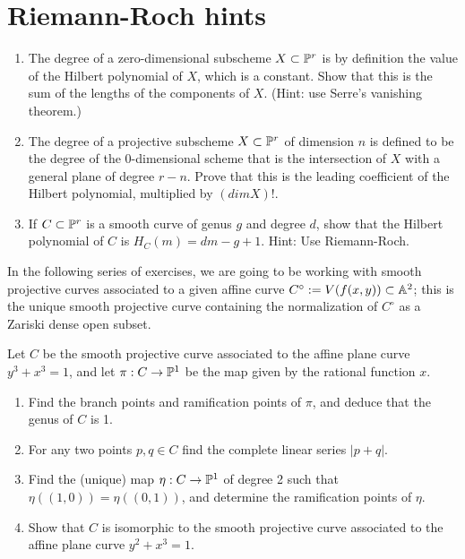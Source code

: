 

\chapter{Riemann-Roch hints}\label{Inflections hints}

 \begin{exercise}\label{characterization of degree}
\begin{enumerate}
\item The degree of a zero-dimensional subscheme $X\subset \PP^r$ is by definition the value of the Hilbert polynomial of $X$, which is a constant. Show that
this is the sum of the lengths of the components of $X$. (Hint: use Serre's vanishing theorem.)

\item The degree of a projective subscheme $X\subset \PP^r$ of dimension $n$ is defined to be the degree of the $0$-dimensional scheme
that is the intersection of $X$ with a general plane of degree $r-n$. Prove that this is the leading coefficient of the Hilbert polynomial, multiplied
by $(dim X)!$.

\item If $C\subset \PP^r$ is a smooth curve of genus $g$ and degree $d$, show that the Hilbert polynomial of $C$ is $H_C(m) = dm-g+1$. Hint: Use Riemann-Roch.

\end{enumerate}
\end{exercise}

In the following series of exercises, we are going to be working with smooth projective curves associated to a given affine curve $C^\circ := V(f(x,y)) \subset \AA^2$; this is the unique smooth projective curve containing the normalization of $C^\circ$ as a Zariski dense open subset.

\begin{exercise}
Let $C$ be the smooth projective curve associated to the affine plane curve $y^3 +x^3 = 1$, and let $\pi : C \to \PP^1$ be the map given by the rational function $x$.
\begin{enumerate}
\item Find the branch points and ramification points of $\pi$, and deduce that the genus of $C$ is 1.
\item For any two points $p, q \in C$ find the complete linear series $|p+q|$.
\item Find the (unique) map $\eta : C \to \PP^1$ of degree 2 such that $\eta((1,0)) = \eta((0,1))$, and determine the ramification points of $\eta$.
\item Show that $C$ is isomorphic to the smooth projective curve associated to the affine plane curve $y^2 +x^3 = 1$.
\end{enumerate}
\end{exercise}

